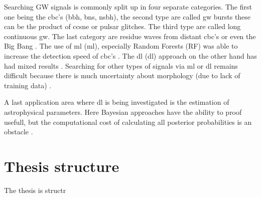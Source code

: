 Searching GW signals is commonly split up in four separate categories. The first one being the \acrshort{cbc}'s (\acrshort{bbh}, \acrshort{bns}, \acrshort{nsbh}), the second type are called \acrshort{gw} bursts these can be the product of \acrshort{ccsne} or pulsar glitches. The third type are called long continuous \acrshort{gw}. The last category are residue waves from distant \acrshort{cbc}'s or even the Big Bang
\citep{abbott2020guide, LIGO_continuous}. The use of \acrlong{ml} (\acrshort{ml}), especially Random Forests (RF) was able to increase the detection speed of \acrshort{cbc}'s \citep{kapadia2017classifier}. The \acrlong{dl} (\acrshort{dl}) approach on the other hand has had mixed results \citep{gebhard2019convolutional,chatterjee2021extraction,ruan2023rapid}. 
Searching for other types of signals via \acrshort{ml} or \acrshort{dl} remains difficult because there is much uncertainty about morphology (due to lack of training data) \citep{cuoco2020enhancing}. 

A last application area where \acrshort{dl} is being investigated is the estimation of astrophysical parameters. Here Bayesian approaches have the ability to proof usefull, but the computational cost of calculating all posterior probabilities is an obstacle \citep{cuoco2020enhancing}.

\section{Thesis structure}
The thesis is structr
\newpage



